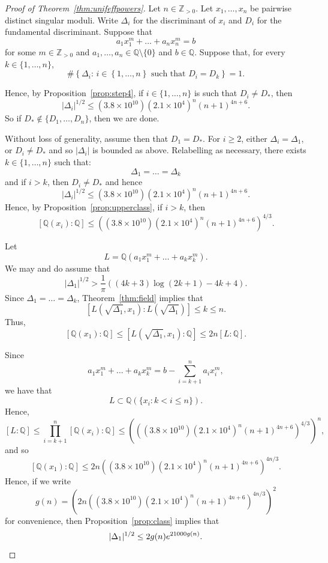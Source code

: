 \documentclass[11pt,a4paper, british]{amsart}
\theoremstyle{definition}
\theoremstyle{remark}
\numberwithin{equation}{section}
\newcommand{\Q}{\mathbb{Q}} %
\newcommand{\Z}{\mathbb{Z}} %
\begin{document}
\begin{proof}[Proof of Theorem~\ref{thm:unifeffpowers}]
	Let $n \in \Z_{>0}$. Let $x_1, \ldots, x_n$ be pairwise distinct singular moduli. 
	Write $\Delta_i$ for the discriminant of $x_i$ and $D_i$ for the fundamental discriminant. 
	Suppose that
	\[ a_1 x_1^m + \ldots + a_n x_n^m = b\]
	for some $m \in \Z_{>0}$ and $a_1, \ldots, a_n \in \Q \setminus \{0\}$ and $b \in \Q$.
	Suppose that, for every	$k \in \{1, \ldots, n\}$,
	\[  \# \left \{ \Delta_i :  \, i \in \left \{1, \ldots, n\right \} \mbox{ such that } D_i = D_k \right \} = 1.\]
	
	Hence, by Proposition~\ref{prop:step4}, if $i \in \{1, \ldots, n\}$ is such that $D_i \neq D_*$, then
	\[ \lvert \Delta_i \rvert^{1/2} \leq (3.8 \times 10^{10})(2.1 \times 10^4)^n (n+1)^{4n+6}.\]
	So if $D_* \notin \{D_1, \ldots, D_n\}$, then we are done. 
	
	
Without loss of generality, assume then that $D_1 = D_*$. For $i \geq 2$, either $\Delta_i = \Delta_1$, or $D_i \neq D_*$ and so $\lvert \Delta_i \rvert$ is bounded as above. Relabelling as necessary, there exists $k \in \{1, \ldots, n\}$ such that:
\[ \Delta_1 = \ldots = \Delta_{k}\]
and if $i > k$, then $D_i \neq D_*$ and hence
\[ \lvert \Delta_i \rvert^{1/2} \leq (3.8 \times 10^{10})(2.1 \times 10^4)^n (n+1)^{4n+6}.\]
Hence, by Proposition~\ref{prop:upperclass}, if $i > k$, then
\[[\Q(x_i) : \Q]  \leq \left((3.8 \times 10^{10})(2.1 \times 10^4)^n (n+1)^{4n+6}\right)^{4/3}.\]

Let
\[ L = \Q(a_1 x_1^m + \ldots + a_k x_k^m).\]
We may and do assume that
\[ \lvert \Delta_1 \rvert^{1/2} > \frac{1}{\pi} \left(\left(4k+3\right) \log\left(2k+1\right) -4k + 4\right).\]
Since $\Delta_1 = \ldots = \Delta_k$, Theorem~\ref{thm:field} implies that
\[ [L(\sqrt{\Delta_1}, x_1) : L(\sqrt{\Delta_1})] \leq k \leq n.\]
Thus,
\[[\Q(x_1) : \Q] \leq [L(\sqrt{\Delta_1}, x_1) : \Q] \leq 2n[L : \Q].\]

Since
\[ a_1 x_1^m + \ldots + a_k x_k^m = b - \sum_{i = k + 1}^n a_{i} x_{i}^m ,\]
we have that
\[ L \subset \Q(\{x_i : k < i \leq n\}).\]
Hence,
\[ [L : \Q] \leq \prod_{i=k+1}^n [\Q(x_i) : \Q] \leq \left( \left((3.8 \times 10^{10})(2.1 \times 10^4)^n (n+1)^{4n+6}\right)^{4/3} \right)^n,\]
and so
\[ [\Q(x_1) : \Q] \leq 2n\left((3.8 \times 10^{10})(2.1 \times 10^4)^n (n+1)^{4n+6}\right)^{4n/3}.\]
Hence, if we write
\[ g(n) = \left(2n\left((3.8 \times 10^{10})(2.1 \times 10^4)^n (n+1)^{4n+6}\right)^{4n/3}\right)^2\]
for convenience, then Proposition~\ref{prop:class} implies that
\[ \lvert \Delta_1 \rvert^{1/2} \leq 2 g(n) e^{21000 g(n)}. \qedhere\]
\end{proof}
\end{document}

